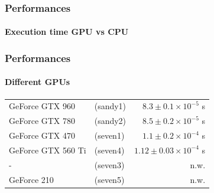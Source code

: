 \begin{frame}
\frametitle{Performances}
\framesubtitle{Execution time GPU vs CPU}
\begin{center}
\end{center}
\end{frame}

\begin{frame}
\frametitle{Performances}
\framesubtitle{Different GPUs}
\begin{center}
\begin{tabular}{l l r}
GeForce GTX 960		&	(sandy1)	&	$8.3\pm0.1\times10^{-5}$ s\\
GeForce GTX 780		&	(sandy2)	&	$8.5\pm0.2\times10^{-5}$ s\\
GeForce GTX 470		&	(seven1)	&	$1.1\pm0.2\times10^{-4}$ s\\
GeForce GTX 560 Ti	&	(seven4)	&	$1.12\pm0.03\times10^{-4}$ s\\
-	&	(seven3)	&	n.w.\\
GeForce 210			&	(seven5)	&	n.w.\\
\end{tabular}
\end{center}
\end{frame}
